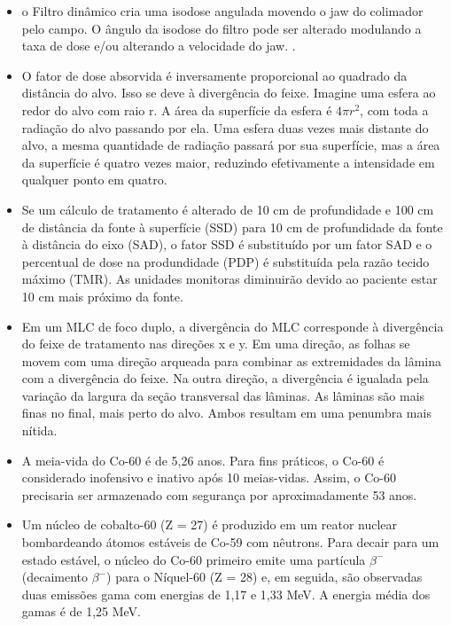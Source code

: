 \documentclass[11pt,a4paper]{article}
\newcounter{exemplo}
\begin{document}
\begin{exemplo}
\begin{itemize}
		\item o Filtro dinâmico cria uma isodose angulada movendo o jaw do colimador pelo campo. O ângulo da isodose do filtro pode ser alterado modulando a taxa de dose e/ou alterando a velocidade do jaw.
		.
		\item O fator de dose absorvida é inversamente proporcional ao quadrado da distância do alvo. Isso se deve à divergência do feixe. Imagine uma esfera ao redor do alvo com raio r. A área da superfície da esfera é $4\pi r^2$, com toda a radiação do alvo passando por ela. Uma esfera duas vezes mais distante do alvo, a mesma quantidade de radiação passará por sua superfície, mas a área da superfície é quatro vezes maior, reduzindo efetivamente a intensidade em qualquer ponto em quatro.
		
		\item Se um cálculo de tratamento é alterado de 10 cm de profundidade e 100 cm de distância da fonte à superfície (SSD) para 10 cm de profundidade da fonte à distância do eixo (SAD), o fator SSD é substituído por um fator SAD e o percentual de dose na produndidade (PDP) é substituída pela razão tecido máximo (TMR). As unidades monitoras diminuirão devido ao paciente estar 10 cm mais próximo da fonte.
		
        \item Em um MLC de foco duplo, a divergência do MLC corresponde à divergência do feixe de tratamento nas direções x e y. Em uma direção, as folhas se movem com uma direção arqueada para combinar as extremidades da lâmina com a divergência do feixe. Na outra direção, a divergência é igualada pela variação da largura da seção transversal das lâminas. As lâminas são mais finas no final, mais perto do alvo. Ambos resultam em uma penumbra mais nítida.

        \item A meia-vida do Co-60 é de 5,26 anos. Para fins práticos, o Co-60 é considerado inofensivo e inativo após 10 meias-vidas. Assim, o Co-60 precisaria ser armazenado com segurança por aproximadamente 53 anos.
        
        \item Um núcleo de cobalto-60 (Z = 27) é produzido em um reator nuclear bombardeando átomos estáveis de Co-59 com nêutrons. Para decair para um estado estável, o núcleo do Co-60 primeiro emite uma partícula $\beta^-$ (decaimento $\beta^-$) para o Níquel-60 (Z = 28) e, em seguida, são observadas duas emissões gama com energias de 1,17 e 1,33 MeV. A energia média dos gamas é de 1,25 MeV.
        

\end{itemize}
\end{exemplo}
\end{document}
